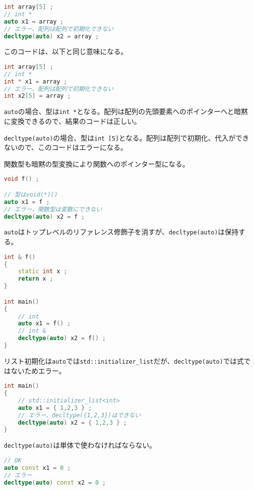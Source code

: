 \begin{lstlisting}[language=C++]
int array[5] ;
// int *
auto x1 = array ;
// エラー、配列は配列で初期化できない
decltype(auto) x2 = array ;
\end{lstlisting}

このコードは、以下と同じ意味になる。

\begin{lstlisting}[language=C++]
int array[5] ;
// int *
int * x1 = array ;
// エラー、配列は配列で初期化できない
int x2[5] = array ;
\end{lstlisting}

\lstinline!auto!の場合、型は\lstinline!int *!となる。配列は配列の先頭要素へのポインターへと暗黙に変換できるので、結果のコードは正しい。

\lstinline!decltype(auto)!の場合、型は\lstinline!int [5]!となる。配列は配列で初期化、代入ができないので、このコードはエラーになる。

関数型も暗黙の型変換により関数へのポインター型になる。

\begin{lstlisting}[language=C++]
void f() ;

// 型はvoid(*)()
auto x1 = f ;
// エラー、関数型は変数にできない
decltype(auto) x2 = f ;
\end{lstlisting}

\lstinline!auto!はトップレベルのリファレンス修飾子を消すが、\lstinline!decltype(auto)!は保持する。

\begin{lstlisting}[language=C++]
int & f()
{
    static int x ;
    return x ;
}

int main()
{
    // int
    auto x1 = f() ;
    // int &
    decltype(auto) x2 = f() ;
}
\end{lstlisting}

リスト初期化は\lstinline!auto!では\lstinline!std::initializer_list!だが、\lstinline!decltype(auto)!では式ではないためエラー。

\begin{lstlisting}[language=C++]
int main()
{
    // std::initializer_list<int>
    auto x1 = { 1,2,3 } ;
    // エラー、decltype({1,2,3})はできない
    decltype(auto) x2 = { 1,2,3 } ;
}
\end{lstlisting}

\lstinline!decltype(auto)!は単体で使わなければならない。

\begin{lstlisting}[language=C++]
// OK
auto const x1 = 0 ; 
// エラー
decltype(auto) const x2 = 0 ;
\end{lstlisting}

